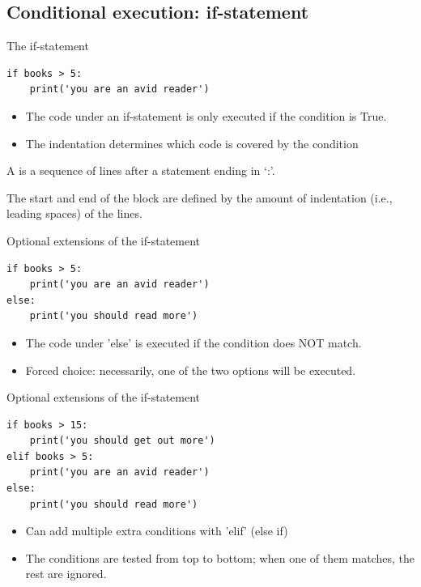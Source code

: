 \documentclass[aspectratio=169,usenames,dvipsnames]{beamer}
\begin{document}
\subsection{Conditional execution: if-statement}
\begin{frame}[fragile]{The if-statement}
\begin{lstlisting}
if books > 5:
    print('you are an avid reader')
\end{lstlisting}

    \begin{itemize}
        \item The code under an if-statement is only executed
            if the condition is True.
        \item The indentation determines which code is covered
            by the condition
    \end{itemize}

    \pause
    \begin{definition}
        A  is a sequence of lines after
        a statement ending in `:'.

        The start and end of the block are defined by the amount of indentation
        (i.e., leading spaces) of the lines.
    \end{definition}
\end{frame}


\begin{frame}[fragile]{Optional extensions of the if-statement}
\begin{lstlisting}
if books > 5:
    print('you are an avid reader')
else:
    print('you should read more')
\end{lstlisting}

\begin{itemize}
    \item The code under 'else' is executed if the condition does NOT match.
    \item Forced choice: necessarily, one of the two options will be executed.
\end{itemize}
\end{frame}


\begin{frame}[fragile]{Optional extensions of the if-statement}
\begin{lstlisting}
if books > 15:
    print('you should get out more')
elif books > 5:
    print('you are an avid reader')
else:
    print('you should read more')
\end{lstlisting}

\begin{itemize}
    \item Can add multiple extra conditions with 'elif' (else if)
    \item The conditions are tested from top to bottom;
            when one of them matches, the rest are ignored.
\end{itemize}
\end{frame}
\end{document}
